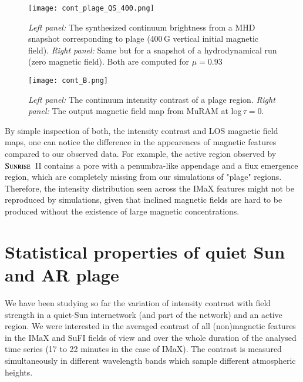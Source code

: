 \documentclass[goettingen, gauss, print]{thesis}
\begin{document}
\begin{figure}
\centering
\hspace*{-0.5cm}\texttt{[image: cont\_plage\_QS\_400.png]}
\caption{\textit{Left panel:} The synthesized continuum brightness from a MHD snapshot corresponding to plage (400\,G vertical initial magnetic field). \textit{Right panel:} Same but for a snapshot of a hydrodynamical run (zero magnetic field). Both are computed for $\mu = 0.93$}
\label{cont_plage_qs_mhd}

\end{figure}


\begin{figure}
\centering
\hspace*{-0.8cm}\texttt{[image: cont\_B.png]}
\caption{\textit{Left panel:} The continuum intensity contrast of a plage region. \textit{Right panel:} The output magnetic field map from MuRAM at log\,$\tau=0$.}
\label{cont_B_mhd}

\end{figure}

By simple inspection of both, the intensity contrast and LOS magnetic field maps, one can notice the difference in the appearences of magnetic features compared to our observed data. For example, the active region observed by $\textsc{Sunrise}$~II contains a pore with a penumbra-like appendage and a flux emergence region, which are completely missing from our simulations of "plage" regions. Therefore, the intensity distribution seen across the IMaX features might not be reproduced by simulations, given that inclined magnetic fields are hard to be produced without the existence of large magnetic concentrations. 

\iffalse
\newpage
\section{Statistical properties of quiet Sun and AR plage}
We have been studying so far the variation of intensity contrast with field strength in a quiet-Sun internetwork (and part of the network) and an active region. We were interested in the averaged contrast of all (non)magnetic features in the IMaX and SuFI fields of view and over the whole duration of the analysed time series (17 to 22 minutes in the case of IMaX). The contrast is measured simultaneously in different wavelength bands which sample different atmospheric heights. 
\end{document}
